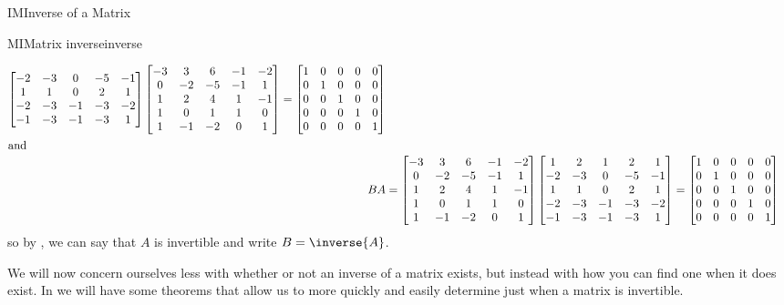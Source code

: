 \begin{subsect}{IM}{Inverse of a Matrix}
\begin{example}{MI}{Matrix inverse}{inverse}
\begin{para}
\begin{align*}
\begin{bmatrix}
 -2 & -3 & 0 & -5 & -1 \\
 1 & 1 & 0 & 2 & 1 \\
 -2 & -3 & -1 & -3 & -2 \\
 -1 & -3 & -1 & -3 & 1
\end{bmatrix}
\begin{bmatrix}
 -3 & 3 & 6 & -1 & -2 \\
 0 & -2 & -5 & -1 & 1 \\
 1 & 2 & 4 & 1 & -1 \\
 1 & 0 & 1 & 1 & 0 \\
 1 & -1 & -2 & 0 & 1
\end{bmatrix}
=
\begin{bmatrix}
1 & 0 & 0 & 0 & 0\\
0 & 1 & 0 & 0 & 0\\
0 & 0 & 1 & 0 & 0\\
0 & 0 & 0 & 1 & 0\\
0 & 0 & 0 & 0 & 1
\end{bmatrix}\\
%
\intertext{and}
%
BA
&=
\begin{bmatrix}
 -3 & 3 & 6 & -1 & -2 \\
 0 & -2 & -5 & -1 & 1 \\
 1 & 2 & 4 & 1 & -1 \\
 1 & 0 & 1 & 1 & 0 \\
 1 & -1 & -2 & 0 & 1
\end{bmatrix}
\begin{bmatrix}
 1 & 2 & 1 & 2 & 1 \\
 -2 & -3 & 0 & -5 & -1 \\
 1 & 1 & 0 & 2 & 1 \\
 -2 & -3 & -1 & -3 & -2 \\
 -1 & -3 & -1 & -3 & 1
\end{bmatrix}
=
\begin{bmatrix}
1 & 0 & 0 & 0 & 0\\
0 & 1 & 0 & 0 & 0\\
0 & 0 & 1 & 0 & 0\\
0 & 0 & 0 & 1 & 0\\
0 & 0 & 0 & 0 & 1
\end{bmatrix}
\end{align*}
%
so by , we can say that $A$ is invertible and write $B=\inverse{A}$.
\end{para}
%
\end{example}
%
\begin{para}We will now concern ourselves less with whether or not an inverse of a matrix exists, but instead with how you can find one when it does exist.  In  we will have some theorems that allow us to more quickly and easily determine just when a matrix is invertible.\end{para}
%
\end{subsect}
